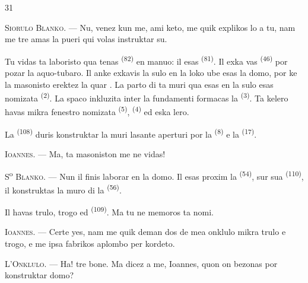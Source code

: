 \begin{VUpage}[33]{31}
\VUsaut{3.0mm}

\VUblancAlinea
\textsc{Siorulo Blanko}. --- Nu, venez kun me, ami\cc
keto, me quik explikos lo a tu, nam me tre\nl
amas la pueri qui volas instruktar su.

\VUblancAlinea
Tu vidas ta laboristo qua tenas  \textsuperscript{(82)}\nl
en manuo: il esas  \textsuperscript{(81)}. Il exka\cc
vas  \textsuperscript{(46)} por pozar la aquo-tubaro. Il\nl
anke exkavis la sulo en la loko ube esas la\nl
domo, por ke la masonisto erektez la quar\nl
{}. La parto di ta muri qua esas en la\nl
sulo esas nomizata  \textsuperscript{(2)}. La spaco\nl
inkluzita inter la fundamenti formacas la\nl
{} \textsuperscript{(3)}. Ta kelero havas mikra fenestro\nl
nomizata  \textsuperscript{(5)},  \textsuperscript{(4)} ed eska\cc
lero.

\VUblancAlinea
La  \textsuperscript{(108)} duris konstruktar la muri\nl
lasante aperturi por la  \textsuperscript{(8)} e la  \textsuperscript{(17)}.

\VUblancAlinea
\textsc{Ioannes}. --- Ma, ta masoniston me ne vidas!

\VUblancAlinea
S\textsuperscript{o} \textsc{Blanko}. --- Nun il finis laborar en la\nl
domo. Il esas proxim la  \textsuperscript{(54)}, sur sua\nl
{} \textsuperscript{(110)}, il konstruktas la muro di la \cc
{} \textsuperscript{(56)}.

\VUblancAlinea
Il havas trulo, trogo ed  \textsuperscript{(109)}. Ma tu\nl
ne memoros ta nomi.

\VUblancAlinea
\textsc{Ioannes}. --- Certe yes, nam me quik deman\cc
dos de mea onklulo mikra trulo e trogo, e me\nl
ipsa fabrikos aplombo per kordeto.

\VUsaut{3.0mm}
\VUsaut{3.0mm}

\VUblancAlinea
\textsc{L'Onklulo}. --- Ha! tre bone. Ma dicez a me,\nl
Ioannes, quon on bezonas por konstruktar\nl
domo?
\end{VUpage}

